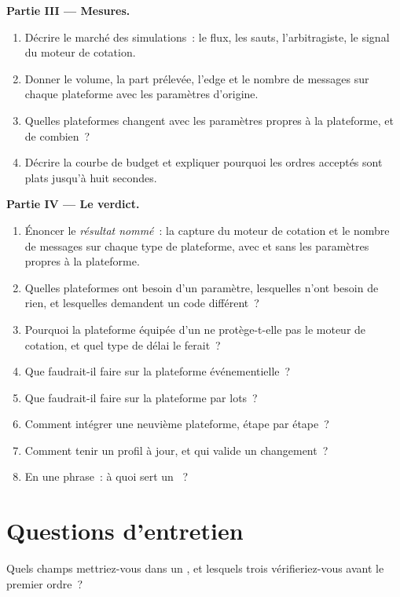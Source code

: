 \begin{problem}
\medskip\noindent\textbf{Partie III --- Mesures.}
\begin{enumerate}[resume]
\item Décrire le marché des simulations~: le flux, les sauts, l'arbitragiste, le signal du moteur de cotation.
\item Donner le volume, la part prélevée, l'edge et le nombre de messages sur chaque plateforme avec les paramètres d'origine.
\item Quelles plateformes changent avec les paramètres propres à la plateforme, et de combien~?
\item Décrire la courbe de budget et expliquer pourquoi les ordres acceptés sont plats jusqu'à huit secondes.
\end{enumerate}

\medskip\noindent\textbf{Partie IV --- Le verdict.}
\begin{enumerate}[resume]
\item Énoncer le \emph{résultat nommé}~: la capture du moteur de cotation et le nombre de messages sur chaque type de plateforme, avec et sans les paramètres propres à la plateforme.
\item Quelles plateformes ont besoin d'un paramètre, lesquelles n'ont besoin de rien, et lesquelles demandent un code différent~?
\item Pourquoi la plateforme équipée d'un  ne protège-t-elle pas le moteur de cotation, et quel type de délai le ferait~?
\item Que faudrait-il faire sur la plateforme événementielle~?
\item Que faudrait-il faire sur la plateforme par lots~?
\item Comment intégrer une neuvième plateforme, étape par étape~?
\item Comment tenir un profil à jour, et qui valide un changement~?
\item En une phrase~: à quoi sert un ~?
\end{enumerate}
\end{problem}

\section{Questions d'entretien}

\begin{interviewq}\label{iq:hf:a-venue-playbook:1}
Quels champs mettriez-vous dans un , et lesquels trois vérifieriez-vous avant le premier ordre~?
\end{interviewq}

